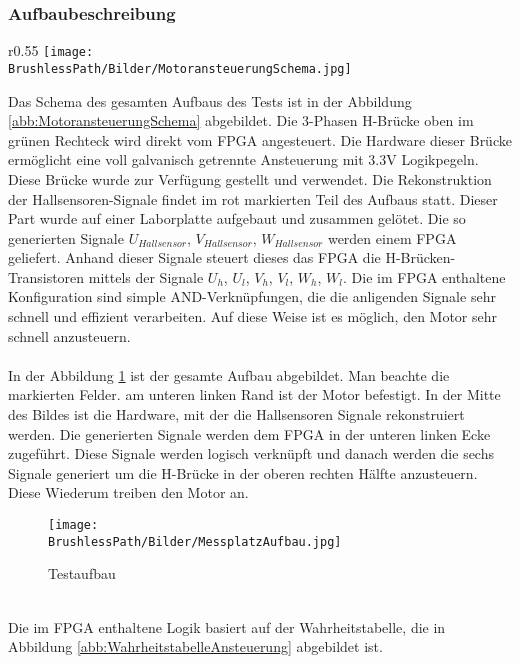 \subsubsection{Aufbaubeschreibung}
\begin{wrapfigure}{r}{0.55\textwidth}
	\texttt{[image: \\BrushlessPath/Bilder/MotoransteuerungSchema.jpg]}
	\centering
	\caption{Schema des Brushless-Versuchsaufbaus}
\label{abb:MotoransteuerungSchema}
\end{wrapfigure}
Das Schema des gesamten Aufbaus des Tests ist in der Abbildung \ref{abb:MotoransteuerungSchema} abgebildet. Die 3-Phasen H-Brücke oben im grünen Rechteck wird direkt vom FPGA angesteuert. Die Hardware dieser Brücke ermöglicht eine voll galvanisch getrennte Ansteuerung mit 3.3V Logikpegeln. Diese Brücke wurde zur Verfügung gestellt und verwendet. Die Rekonstruktion der Hallsensoren-Signale findet im rot markierten Teil des Aufbaus statt. Dieser Part wurde auf einer Laborplatte aufgebaut und zusammen gelötet. Die so generierten Signale $U_{Hallsensor}$, $V_{Hallsensor}$, $W_{Hallsensor}$ werden einem FPGA geliefert. Anhand dieser Signale steuert dieses das FPGA die H-Brücken-Transistoren mittels der Signale $U_h$, $U_l$, $V_h$, $V_l$, $W_h$, $W_l$. Die im FPGA enthaltene Konfiguration sind simple AND-Verknüpfungen, die die anligenden Signale sehr schnell und effizient verarbeiten. Auf diese Weise ist es möglich, den Motor sehr schnell anzusteuern.\\
\\
In der Abbildung \ref{abb:MessplatzAufbau} ist der gesamte Aufbau abgebildet. Man beachte die markierten Felder. am unteren linken Rand ist der Motor befestigt. In der Mitte des Bildes ist die Hardware, mit der die Hallsensoren Signale rekonstruiert werden. Die generierten Signale werden dem FPGA in der unteren linken Ecke zugeführt. Diese Signale werden logisch verknüpft und danach werden die sechs Signale generiert um die H-Brücke in der oberen rechten Hälfte anzusteuern. Diese Wiederum treiben den Motor an.
\begin{figure}[h!]
	\texttt{[image: \\BrushlessPath/Bilder/MessplatzAufbau.jpg]}
	\centering
	\caption{Testaufbau} 
\label{abb:MessplatzAufbau}
\end{figure}\\
Die im FPGA enthaltene Logik basiert auf der Wahrheitstabelle, die in Abbildung \ref{abb:WahrheitstabelleAnsteuerung} abgebildet ist.
